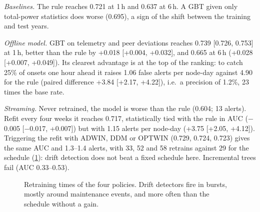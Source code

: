 \begin{table}[t]
\caption{Anticipation of drains within 1\,h and 6\,h. AUC is the mean per-node AUC with bootstrap 95\% interval; $\Delta$ is the paired difference to the best single-feature rule$^a$ (all onsets, 1\,h); alerts are false alerts per node-day at 25\% recall. $^a$ chosen on training data ($-$total\_power\_max at 1\,h, $-$gpu0\_core\_temp\_avg at 6\,h). $^b$ chosen after inspecting all data, optimistic.}
\label{tab:anticipation}
\centering\small

\end{table}

\emph{Baselines.} The rule reaches 0.721 at 1\,h and 0.637 at 6\,h. A GBT given only total-power statistics does worse (0.695), a sign of the shift between the training and test years.

\emph{Offline model.} GBT on telemetry and peer deviations reaches 0.739 [0.726, 0.753] at 1\,h, better than the rule by +0.018 [+0.004, +0.032], and 0.665 at 6\,h (+0.028 [+0.007, +0.049]). Its clearest advantage is at the top of the ranking: to catch 25\% of onsets one hour ahead it raises 1.06 false alerts per node-day against 4.90 for the rule (paired difference +3.84 [+2.17, +4.22]), i.e.\ a precision of 1.2\%, 23 times the base rate.

\emph{Streaming.} Never retrained, the model is worse than the rule (0.604; 13 alerts). Refit every four weeks it reaches 0.717, statistically tied with the rule in AUC ($-$0.005 [$-$0.017, +0.007]) but with 1.15 alerts per node-day (+3.75 [+2.05, +4.12]). Triggering the refit with ADWIN, DDM or OPTWIN (0.729, 0.724, 0.723) gives the same AUC and 1.3--1.4 alerts, with 33, 52 and 58 retrains against 29 for the schedule (\cref{fig:retrains}): drift detection does not beat a fixed schedule here. Incremental trees fail (AUC 0.33--0.53).

\begin{figure}[t]
\centering
{}
\caption{Retraining times of the four policies. Drift detectors fire in bursts, mostly around maintenance events, and more often than the schedule without a gain.}
\label{fig:retrains}
\end{figure}

